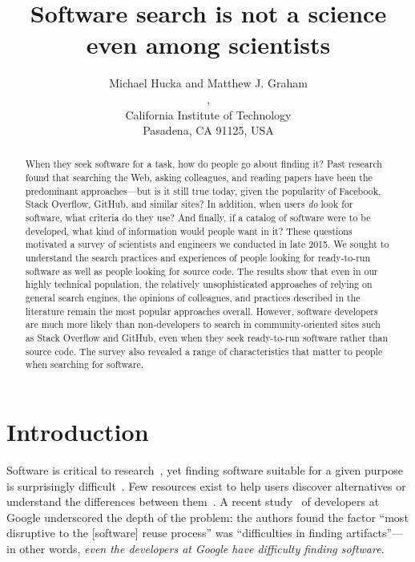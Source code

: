 \documentclass{casicswhitepaper}
\begin{document}
\title{\vspace*{-3ex}Software search is not a science even among scientists}
\date{\vspace*{-1ex}\dateAndVersion}
\author{Michael Hucka and Matthew J. Graham\\
,\quad{}\\
California Institute of Technology\\
Pasadena, CA 91125, USA}
\maketitle

\begin{abstract}
  When they seek software for a task, how do people go about finding it?  Past research found that searching the Web, asking colleagues, and reading papers have been the predominant approaches---but is it still true today, given the popularity of Facebook, Stack Overflow, GitHub, and similar sites?  In addition, when users \emph{do} look for software, what criteria do they use?  And finally, if a catalog of software were to be developed, what kind of information would people want in it?  These questions motivated a survey of scientists and engineers we conducted in late 2015.  We sought to understand the search practices and experiences of people looking for ready-to-run software as well as people looking for source code.  The results show that even in our highly technical population, the relatively unsophisticated approaches of relying on general search engines, the opinions of colleagues, and practices described in the literature remain the most popular approaches overall.  However, software developers are much more likely than non-developers to search in community-oriented sites such as Stack Overflow and GitHub, even when they seek ready-to-run software rather than source code.  The survey also revealed a range of characteristics that matter to people when searching for software.
\end{abstract}


\section{Introduction}

Software is critical to research~, yet finding software suitable for a given purpose is surprisingly difficult~\cite{cannata_2005, Bourne::2015, white2014nih}.  Few resources exist to help users discover alternatives or understand the differences between them~\cite{white2014nih}.  A recent study~\cite{bauer2014exploratory} of developers at Google underscored the depth of the problem: the authors found the factor ``most disruptive to the [software] reuse process'' was ``difficulties in finding artifacts''---in other words, \emph{even the developers at Google have difficulty finding software}.
\end{document}

